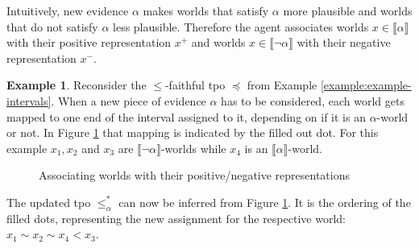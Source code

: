 \documentclass[english, 12pt]{scrartcl}
\theoremstyle{definition}
\newtheorem{example}{Example}
\theoremstyle{definition}
\theoremstyle{definition}
\newcommand{\modelsOf}[1]{\llbracket #1 \rrbracket}
\begin{document}
Intuitively, new evidence $\alpha$ makes worlds that satisfy $\alpha$ more plausible and worlds that do not satisfy $\alpha$ less plausible. Therefore the agent associates worlds $x \in \modelsOf{\alpha}$ with their positive representation $x^{+}$ and worlds $x \in \modelsOf{\neg\alpha}$ with their negative representation $x^{-}$.

\begin{example}
    \label{example:example-updated-tpo}
    Reconsider the $\leq$-faithful tpo $\preceq$ from Example \ref{example:example-intervals}. When a new piece of evidence $\alpha$ has to be considered, each world gets mapped to one end of the interval assigned to it, depending on if it is an $\alpha$-world or not. In Figure \ref{fig:example-updated-tpo} that mapping is indicated by the filled out dot. For this example $x_{1}, x_{2}$ and $x_{3}$ are $\modelsOf{\neg\alpha}$-worlds while $x_{4}$ is an $\modelsOf{\alpha}$-world.

    \begin{figure}[H]
        \centering
        \caption{Associating worlds with their positive/negative representations}
        \label{fig:example-updated-tpo}
    \end{figure}
    
    The updated tpo $\leq_{\alpha}^{\ast}$ can now be inferred from Figure \ref{fig:example-updated-tpo}. It is the ordering of the filled dots, representing the new assignment for the respective world: $x_{1} \sim x_{2} \sim x_{4} < x_{3}$.
\end{example}
\end{document}
